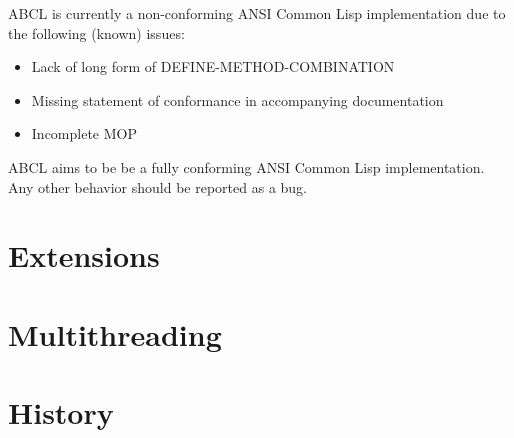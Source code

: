 \documentclass[10pt]{article}
\begin{document}
ABCL is currently a non-conforming ANSI Common Lisp implementation due
to the following (known) issues:

\begin{itemize}
  \item Lack of long form of DEFINE-METHOD-COMBINATION
  \item Missing statement of conformance in accompanying documentation
  \item Incomplete MOP 
\end{itemize}

ABCL aims to be be a fully conforming ANSI Common Lisp
implementation.  Any other behavior should be reported as a bug.

\section{Extensions}


\section{Multithreading}


\section{History}
\end{document}
